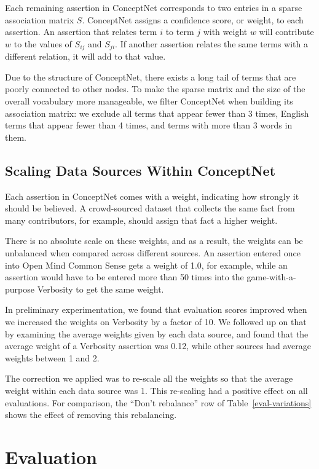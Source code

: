 \documentclass[11pt,letterpaper]{article}
\begin{document}
Each remaining assertion in ConceptNet corresponds to two entries in a sparse
association matrix $S$. ConceptNet assigns a confidence score, or weight, to
each assertion. An assertion that relates term $i$ to term $j$ with weight $w$
will contribute $w$ to the values of $S_{ij}$ and $S_{ji}$. If another
assertion relates the same terms with a different relation, it will add to that
value.

Due to the structure of ConceptNet, there exists a long tail of terms that are
poorly connected to other nodes. To make the sparse matrix and the size of the
overall vocabulary more manageable, we filter ConceptNet when building its
association matrix: we exclude all terms that appear fewer than 3 times, English
terms that appear fewer than 4 times, and terms with more than 3 words in them.

\subsection{Scaling Data Sources Within ConceptNet}

Each assertion in ConceptNet comes with a weight, indicating how strongly it
should be believed. A crowd-sourced dataset that collects the same fact from
many contributors, for example, should assign that fact a higher weight.

There is no absolute scale on these weights, and as a result, the weights can
be unbalanced when compared across different sources. An assertion entered once
into Open Mind Common Sense gets a weight of 1.0, for example, while an
assertion would have to be entered more than 50 times into the
game-with-a-purpose Verbosity to get the same weight.

In preliminary experimentation, we found that evaluation scores improved when
we increased the weights on Verbosity by a factor of 10. We followed up on that
by examining the average weights given by each data source, and found that the
average weight of a Verbosity assertion was 0.12, while other sources had
average weights between 1 and 2.

The correction we applied was to re-scale all the weights so that the average
weight within each data source was 1. This re-scaling had a positive effect
on all evaluations. For comparison, the ``Don't rebalance'' row of
Table~\ref{eval-variations} shows the effect of removing this rebalancing.

\section{Evaluation}
\end{document}

